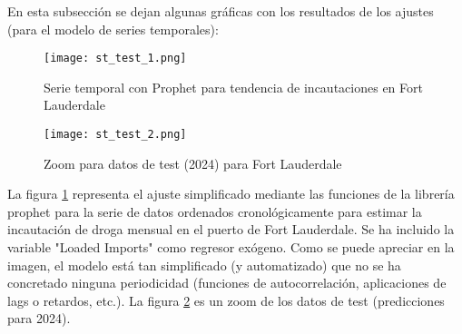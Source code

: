 \documentclass[12pt]{article}
\begin{document}
	En esta subsección se dejan algunas gráficas con los resultados de los ajustes (para el modelo de series temporales):
	
	\begin{figure}[H]
		\caption{\label{st_test_1} Serie temporal con Prophet para tendencia de incautaciones en Fort Lauderdale}
		\centering
		\hspace*{1cm}
		\texttt{[image: st\_test\_1.png]}
	\end{figure}

	\begin{figure}[H]
		\caption{\label{st_test_2} Zoom para datos de test (2024) para Fort Lauderdale}
		\centering
		\hspace*{1cm}
		\texttt{[image: st\_test\_2.png]}
	\end{figure}

	La figura \ref{st_test_1} representa el ajuste simplificado mediante las funciones de la librería prophet para la serie de datos ordenados cronológicamente para estimar la incautación de droga mensual en el puerto de Fort Lauderdale. Se ha incluido la variable "Loaded Imports" como regresor exógeno. Como se puede apreciar en la imagen, el modelo está tan simplificado (y automatizado) que no se ha concretado ninguna periodicidad (funciones de autocorrelación, aplicaciones de lags o retardos, etc.). La figura \ref{st_test_2} es un zoom de los datos de test (predicciones para 2024).
	
	
\end{document}
